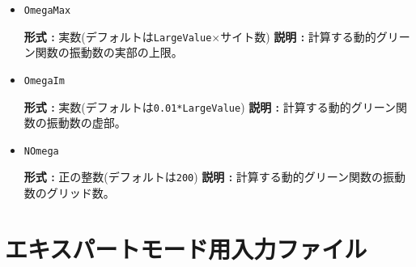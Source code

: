 \begin{itemize}
  \item \verb|OmegaMax|

    {\bf 形式 :} 実数(デフォルトは\verb|LargeValue|$\times$サイト数)
    {\bf 説明 :} 計算する動的グリーン関数の振動数の実部の上限。

  \item \verb|OmegaIm|

    {\bf 形式 :} 実数(デフォルトは\verb|0.01*LargeValue|)
    {\bf 説明 :} 計算する動的グリーン関数の振動数の虚部。

  \item \verb|NOmega|
  
    {\bf 形式 :} 正の整数(デフォルトは\verb|200|)
    {\bf 説明 :} 計算する動的グリーン関数の振動数のグリッド数。

\end{itemize}

\newpage
\section{エキスパートモード用入力ファイル}
\label{Ch:HowToExpert}

